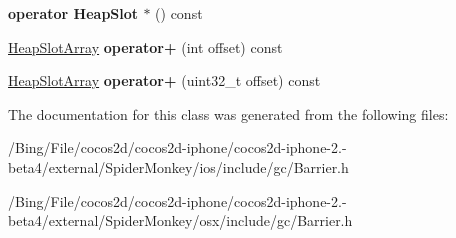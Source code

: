 \begin{DoxyCompactItemize}
\item 
\hypertarget{classjs_1_1_heap_slot_array_a951154e56cdfd668723ed4d1c0f949b8}{{\bfseries operator Heap\-Slot $\ast$} () const }\label{classjs_1_1_heap_slot_array_a951154e56cdfd668723ed4d1c0f949b8}

\item 
\hypertarget{classjs_1_1_heap_slot_array_a6fcb0a18f554f13810d1240e1655a1ec}{\hyperlink{classjs_1_1_heap_slot_array}{Heap\-Slot\-Array} {\bfseries operator+} (int offset) const }\label{classjs_1_1_heap_slot_array_a6fcb0a18f554f13810d1240e1655a1ec}

\item 
\hypertarget{classjs_1_1_heap_slot_array_a4db1c782593ccb48a6eea35077ce1296}{\hyperlink{classjs_1_1_heap_slot_array}{Heap\-Slot\-Array} {\bfseries operator+} (uint32\-\_\-t offset) const }\label{classjs_1_1_heap_slot_array_a4db1c782593ccb48a6eea35077ce1296}

\end{DoxyCompactItemize}


The documentation for this class was generated from the following files\-:\begin{DoxyCompactItemize}
\item 
/\-Bing/\-File/cocos2d/cocos2d-\/iphone/cocos2d-\/iphone-\/2.-\/beta4/external/\-Spider\-Monkey/ios/include/gc/Barrier.\-h\item 
/\-Bing/\-File/cocos2d/cocos2d-\/iphone/cocos2d-\/iphone-\/2.-\/beta4/external/\-Spider\-Monkey/osx/include/gc/Barrier.\-h\end{DoxyCompactItemize}

